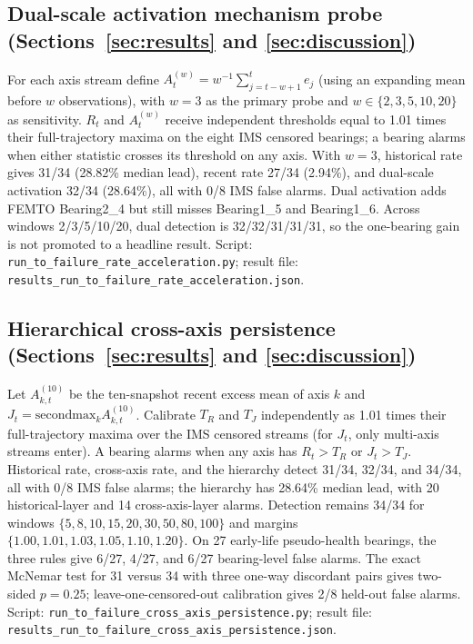 \documentclass[journal]{IEEEtran}
\begin{document}
\subsection*{Dual-scale activation mechanism probe (Sections~\ref{sec:results} and \ref{sec:discussion})}
For each axis stream define $A_t^{(w)}=w^{-1}\sum_{j=t-w+1}^{t}e_j$ (using an expanding mean before $w$ observations), with $w=3$ as the primary probe and $w\in\{2,3,5,10,20\}$ as sensitivity. $R_t$ and $A_t^{(w)}$ receive independent thresholds equal to 1.01 times their full-trajectory maxima on the eight IMS censored bearings; a bearing alarms when either statistic crosses its threshold on any axis. With $w=3$, historical rate gives 31/34 (28.82\% median lead), recent rate 27/34 (2.94\%), and dual-scale activation 32/34 (28.64\%), all with 0/8 IMS false alarms. Dual activation adds FEMTO Bearing2\_4 but still misses Bearing1\_5 and Bearing1\_6. Across windows 2/3/5/10/20, dual detection is 32/32/31/31/31, so the one-bearing gain is not promoted to a headline result. Script: \texttt{run\_to\_failure\_rate\_acceleration.py}; result file: \texttt{results\_run\_to\_failure\_rate\_acceleration.json}.

\subsection*{Hierarchical cross-axis persistence (Sections~\ref{sec:results} and \ref{sec:discussion})}
Let $A_{k,t}^{(10)}$ be the ten-snapshot recent excess mean of axis $k$ and $J_t=\mathrm{secondmax}_k A_{k,t}^{(10)}$. Calibrate $T_R$ and $T_J$ independently as 1.01 times their full-trajectory maxima over the IMS censored streams (for $J_t$, only multi-axis streams enter). A bearing alarms when any axis has $R_t>T_R$ or $J_t>T_J$. Historical rate, cross-axis rate, and the hierarchy detect 31/34, 32/34, and 34/34, all with 0/8 IMS false alarms; the hierarchy has 28.64\% median lead, with 20 historical-layer and 14 cross-axis-layer alarms. Detection remains 34/34 for windows $\{5,8,10,15,20,30,50,80,100\}$ and margins $\{1.00,1.01,1.03,1.05,1.10,1.20\}$. On 27 early-life pseudo-health bearings, the three rules give 6/27, 4/27, and 6/27 bearing-level false alarms. The exact McNemar test for 31 versus 34 with three one-way discordant pairs gives two-sided $p=0.25$; leave-one-censored-out calibration gives 2/8 held-out false alarms. Script: \texttt{run\_to\_failure\_cross\_axis\_persistence.py}; result file: \texttt{results\_run\_to\_failure\_cross\_axis\_persistence.json}.
\end{document}
